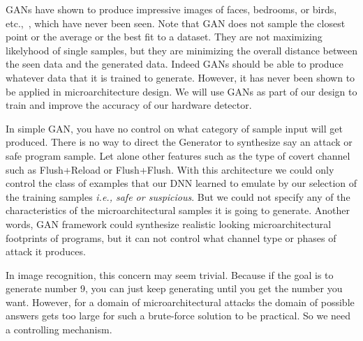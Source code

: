 GANs have shown to produce impressive images of faces, bedrooms, or birds, etc.,~\cite{}, which have never been seen. Note that GAN does not sample the closest point or the average or the best fit to a dataset. They are not maximizing likelyhood of single samples, but they are minimizing the overall distance between the seen data and the generated data.  Indeed GANs should be able to produce whatever data that it is trained to generate. However, it has never been shown to be applied in microarchitecture design. We will use GANs as part of our design to train and improve the accuracy of our hardware detector.  


 In simple GAN, you have no control on what category of sample input will get produced. There is no way to direct the Generator to synthesize say an attack or safe program sample. Let alone other features such as the type of covert channel such as Flush+Reload or Flush+Flush.
With this architecture we could only control the class of examples that our DNN learned to emulate by our selection of the training samples {\em i.e., safe or suspicious}. But we could not specify any of the characteristics of the microarchitectural samples it is going to generate. Another words, GAN framework could synthesize realistic looking microarchitectural footprints of programs, but it can not control what channel type or phases of attack it produces.

 
 In image recognition, this concern may seem trivial. Because if the goal is to generate number 9, you can just keep generating until you get the number you want. However, for a domain of microarchitectural attacks the domain of possible answers gets too large for such a brute-force solution to be practical. So we need a controlling mechanism.


